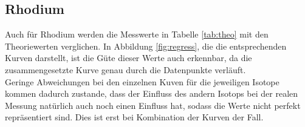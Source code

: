 \subsection{Rhodium}

Auch für Rhodium werden die Messwerte in Tabelle \ref{tab:theo} mit den Theoriewerten verglichen.
In Abbildung \ref{fig:regress}, die die entsprechenden Kurven darstellt, ist die Güte dieser 
Werte auch erkennbar, da die zusammengesetzte Kurve genau durch die Datenpunkte verläuft. \\
Geringe Abweichungen bei den einzelnen Kuven für die jeweiligen Isotope kommen dadurch zustande, dass der Einfluss des andern Isotops bei der realen Messung natürlich auch noch
einen Einfluss hat, sodass die Werte nicht perfekt repräsentiert sind. Dies ist erst bei Kombination der Kurven der Fall. 